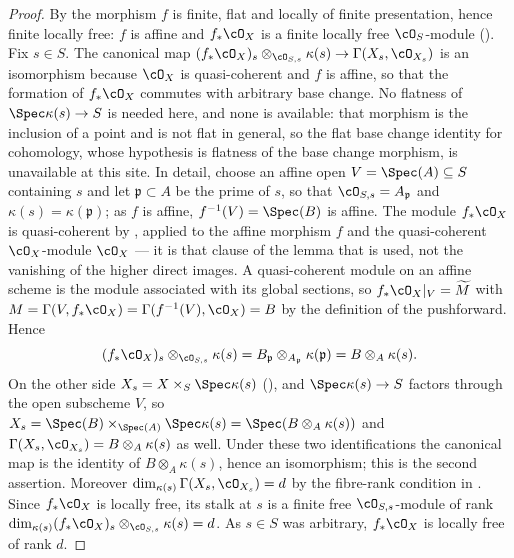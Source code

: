 \begin{proof}
By  the morphism $f$ is finite, flat
and locally of finite presentation, hence finite locally free: $f$ is
affine and $f_*\cO_X$ is a finite locally free $\cO_S$-module
().  Fix $s\in S$.  The
canonical map
$(f_*\cO_X)_s\otimes_{\cO_{S,s}}\kappa(s)\to\Gamma(X_s,\cO_{X_s})$ is
an isomorphism because $\cO_X$ is quasi-coherent and $f$ is affine, so
that the formation of $f_*\cO_X$ commutes with arbitrary base change.
No flatness of $\Spec\kappa(s)\to S$ is needed here, and none is
available: that morphism is the inclusion of a point and is not flat in
general, so the flat base change identity for cohomology, whose
hypothesis is flatness of the base change morphism, is unavailable at
this site.  In detail, choose an affine open $V=\Spec(A)\subseteq S$
containing $s$ and let $\mathfrak p\subset A$ be the prime of $s$, so that
$\cO_{S,s}=A_{\mathfrak p}$ and $\kappa(s)=\kappa(\mathfrak p)$; as $f$
is affine, $f^{-1}(V)=\Spec(B)$ is affine.  The module $f_*\cO_X$ is
quasi-coherent by , applied to the
affine morphism $f$ and the quasi-coherent $\cO_X$-module $\cO_X$ --- it
is that clause of the lemma that is used, not the vanishing of the
higher direct images.  A quasi-coherent module on an affine scheme is
the module associated with its global sections, so
$f_*\cO_X|_V=\widetilde M$ with
$M=\Gamma(V,f_*\cO_X)=\Gamma(f^{-1}(V),\cO_X)=B$ by the definition of
the pushforward.  Hence
\[
(f_*\cO_X)_s\otimes_{\cO_{S,s}}\kappa(s)
=B_{\mathfrak p}\otimes_{A_{\mathfrak p}}\kappa(\mathfrak p)
=B\otimes_A\kappa(s).
\]
On the other side $X_s=X\times_S\Spec\kappa(s)$
(), and $\Spec\kappa(s)\to S$ factors through
the open subscheme $V$, so
$X_s=\Spec(B)\times_{\Spec(A)}\Spec\kappa(s)=\Spec(B\otimes_A\kappa(s))$
and $\Gamma(X_s,\cO_{X_s})=B\otimes_A\kappa(s)$ as well.  Under these
two identifications the canonical map is the identity of
$B\otimes_A\kappa(s)$, hence an isomorphism; this is the second
assertion.
Moreover $\dim_{\kappa(s)}\Gamma(X_s,\cO_{X_s})=d$ by the fibre-rank
condition in .  Since $f_*\cO_X$ is
locally free, its stalk at $s$ is a finite free $\cO_{S,s}$-module of
rank $\dim_{\kappa(s)}(f_*\cO_X)_s\otimes_{\cO_{S,s}}\kappa(s)=d$.  As
$s\in S$ was arbitrary, $f_*\cO_X$ is locally free of rank $d$.
\end{proof}

